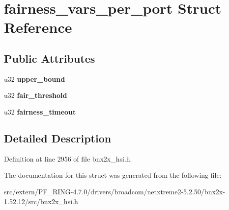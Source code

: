 \hypertarget{structfairness__vars__per__port}{
\section{fairness\_\-vars\_\-per\_\-port Struct Reference}
\label{structfairness__vars__per__port}
}
\subsection*{Public Attributes}
\begin{DoxyCompactItemize}
\item 
\hypertarget{structfairness__vars__per__port_a1c27def04f82a6e600cac222761ee522}{
u32 {\bfseries upper\_\-bound}}
\label{structfairness__vars__per__port_a1c27def04f82a6e600cac222761ee522}

\item 
\hypertarget{structfairness__vars__per__port_a0997f797a8123afc8bd0999cf6fa89e2}{
u32 {\bfseries fair\_\-threshold}}
\label{structfairness__vars__per__port_a0997f797a8123afc8bd0999cf6fa89e2}

\item 
\hypertarget{structfairness__vars__per__port_a54356d3641b290d54e337f1118c83ca6}{
u32 {\bfseries fairness\_\-timeout}}
\label{structfairness__vars__per__port_a54356d3641b290d54e337f1118c83ca6}

\end{DoxyCompactItemize}


\subsection{Detailed Description}


Definition at line 2956 of file bnx2x\_\-hsi.h.



The documentation for this struct was generated from the following file:\begin{DoxyCompactItemize}
\item 
src/extern/PF\_\-RING-\/4.7.0/drivers/broadcom/netxtreme2-\/5.2.50/bnx2x-\/1.52.12/src/bnx2x\_\-hsi.h\end{DoxyCompactItemize}
